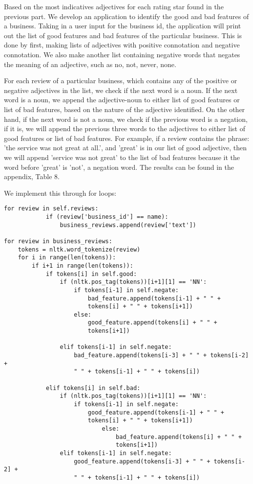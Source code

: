 Based on the most indicatives adjectives for each rating star found in the previous part. We develop an application to identify the good and bad features of a business. Taking in a user input for the business id, the application will print out the list of good features and bad features of the particular business. This is done by first, making lists of adjectives with positive connotation and negative connotation. We also make another list containing negative words that negates the meaning of an adjective, such as no, not, never, none. 

For each review of a particular business, which contains any of the positive or negative adjectives in the list, we check if the next word is a noun. If the next word is a noun, we append the adjective-noun to either list of good features or list of bad features, based on the nature of the adjective identified. On the other hand, if the next word is not a noun, we check if the previous word is a negation, if it is, we will append the previous three words to the adjectives to either list of good features or list of bad features. For example, if a review contains the phrase: 'the service was not great at all.', and 'great' is in our list of good adjective, then we will append 'service was not great' to the list of bad features because it the word before 'great' is 'not', a negation word. The results can be found in the appendix, Table 8.

We implement this through for loops:

\begin{Verbatim}[fontsize=\tiny]
for review in self.reviews:
            if (review['business_id'] == name):
                business_reviews.append(review['text'])

for review in business_reviews:
    tokens = nltk.word_tokenize(review)
    for i in range(len(tokens)):
        if i+1 in range(len(tokens)):
            if tokens[i] in self.good:
                if (nltk.pos_tag(tokens))[i+1][1] == 'NN':
                    if tokens[i-1] in self.negate:
                        bad_feature.append(tokens[i-1] + " " + 
                        tokens[i] + " " + tokens[i+1])
                    else:
                        good_feature.append(tokens[i] + " " + 
                        tokens[i+1])

                elif tokens[i-1] in self.negate:
                    bad_feature.append(tokens[i-3] + " " + tokens[i-2] + 
                    " " + tokens[i-1] + " " + tokens[i])

            elif tokens[i] in self.bad:
                if (nltk.pos_tag(tokens))[i+1][1] == 'NN':
                    if tokens[i-1] in self.negate:
                        good_feature.append(tokens[i-1] + " " + 
                        tokens[i] + " " + tokens[i+1])
                            else:
                                bad_feature.append(tokens[i] + " " + 
                                tokens[i+1])
                elif tokens[i-1] in self.negate:
                    good_feature.append(tokens[i-3] + " " + tokens[i-2] + 
                    " " + tokens[i-1] + " " + tokens[i])
\end{Verbatim}

